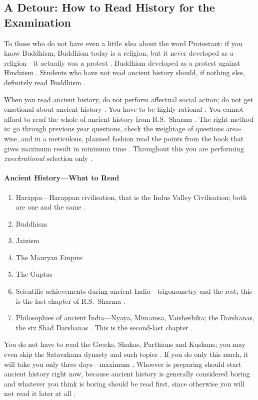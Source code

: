 \subsection{A Detour: How to Read History for the Examination}
To those who do not have even a little idea about the word Protestant: if you know Buddhism, Buddhism today is a religion, but it never developed as a religion---it actually was a protest . Buddhism developed as a protest against Hinduism . Students who have not read ancient history should, if nothing else, definitely read Buddhism .

\begin{PYQLink}
When you read ancient history, do not perform affectual social action; do not get emotional about ancient history . You have to be highly rational .
You cannot afford to read the whole of ancient history from R.S.~Sharma . The right method is: go through previous year questions, check the weightage of questions area-wise, and in a meticulous, planned fashion read the points from the book that gives maximum result in minimum time .
Throughout this you are performing \textit{zweckrational} selection only .
\end{PYQLink}

\paragraph{Ancient History---What to Read}
\begin{enumerate}
    \item Harappa---Harappan civilisation, that is the Indus Valley Civilisation; both are one and the same .
    \item Buddhism 
    \item Jainism 
    \item The Mauryan Empire 
    \item The Guptas 
    \item Scientific achievements during ancient India---trigonometry and the rest; this is the last chapter of R.S.~Sharma .
    \item Philosophies of ancient India---Nyaya, Mimamsa, Vaisheshika; the Darshanas, the six Shad Darshanas . This is the second-last chapter .
\end{enumerate}
You do not have to read the Greeks, Shakas, Parthians and Kushans; you may even skip the Satavahana dynasty and such topics . If you do only this much, it will take you only three days---maximum .
Whoever is preparing should start ancient history right now, because ancient history is generally considered boring and whatever you think is boring should be read first, since otherwise you will not read it later at all .

